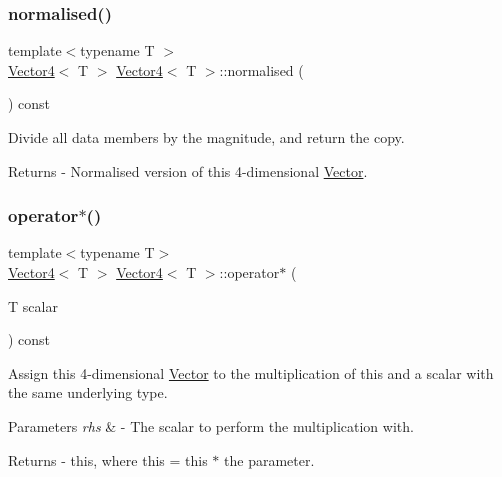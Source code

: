 \subsubsection{\texorpdfstring{normalised()}{normalised()}}
{\footnotesize\ttfamily template$<$typename T $>$ \\
\mbox{\hyperlink{class_vector4}{Vector4}}$<$ T $>$ \mbox{\hyperlink{class_vector4}{Vector4}}$<$ T $>$\+::normalised (\begin{DoxyParamCaption}{ }\end{DoxyParamCaption}) const}

Divide all data members by the magnitude, and return the copy. \begin{DoxyReturn}{Returns}
-\/ Normalised version of this 4-\/dimensional \mbox{\hyperlink{class_vector}{Vector}}. 
\end{DoxyReturn}
\mbox{\label{class_vector4_ae808773615c6a150b3350744fc055f6a}} 
\subsubsection{\texorpdfstring{operator$\ast$()}{operator*()}}
{\footnotesize\ttfamily template$<$typename T$>$ \\
\mbox{\hyperlink{class_vector4}{Vector4}}$<$ T $>$ \mbox{\hyperlink{class_vector4}{Vector4}}$<$ T $>$\+::operator$\ast$ (\begin{DoxyParamCaption}\item[{T}]{scalar }\end{DoxyParamCaption}) const}

Assign this 4-\/dimensional \mbox{\hyperlink{class_vector}{Vector}} to the multiplication of this and a scalar with the same underlying type. 
\begin{DoxyParams}{Parameters}
{\em rhs} & -\/ The scalar to perform the multiplication with. \\
\hline
\end{DoxyParams}
\begin{DoxyReturn}{Returns}
-\/ this, where \textquotesingle{}this = this $\ast$ the parameter\textquotesingle{}. 
\end{DoxyReturn}
\mbox{\label{class_vector4_a3d716714c9bb1d78afb0fbc3df1b4f6a}} 
